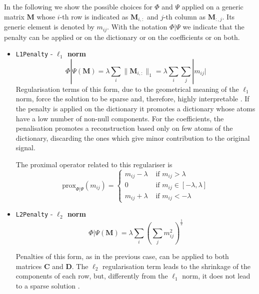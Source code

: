 In the following we show the possible choices for $\Phi$ and $\Psi$ applied on a generic matrix $\textbf{M}$ whose $i$-th row is indicated as $\textbf{M}_{i,:}$ and $j$-th column as $\textbf{M}_{:,j}$. Its generic element is denoted by $m_{ij}$. With the notation $\Phi|\Psi$ we indicate that the penalty can be applied or on the dictionary or on the coefficients or on both.\\
\begin{itemize}
%
%
%
\item \texttt{L1Penalty} - \textbf{$\ell_1$ norm}
\begin{equation}\label{l1penalty}
\Phi|\Psi(\mathbf{M}) = \lambda \sum_i \|\mathbf{M}_{i,:}\|_1 =  \lambda \sum_i \sum_j |m_{ij}|
\end{equation}
Regularisation terms of this form, due to the geometrical meaning of the $\ell_1$ norm, force the solution to be sparse and, therefore, highly interpretable \cite{tibshirani1996regression}. If the penalty is applied on the dictionary it promotes a dictionary whose atoms have a low number of non-null components. For the coefficients, the penalisation promotes a reconstruction based only on few atoms of the dictionary, discarding the ones which give minor contribution to the original signal.

The proximal operator related to this regulariser is
\begin{equation}\label{proxl1}
\text{prox}_{\Phi|\Psi}(m_{ij}) =
\begin{cases}
       m_{ij} - \lambda &\text{ if }m_{ij} > \lambda \\
       0 & \text{ if }m_{ij} \in [-\lambda, \lambda] \\
       m_{ij} + \lambda & \text{ if }m_{ij} < -\lambda
\end{cases}
\end{equation}
%
%
%
\item \texttt{L2Penalty} - \textbf{$\ell_2$ norm}
\begin{equation}\label{l2penalty}
\Phi|\Psi(\mathbf{M}) = \lambda \sum_{i}\left({\sum_j m_{ij}^2}\right)^\frac12
\end{equation}

Penalties of this form, as in the previous case, can be applied to both matrices $\mathbf{C}$ and $\mathbf{D}$.
The $\ell_2$ regularisation term leads to the shrinkage of the components of each row, but, differently from the $\ell_1$ norm, it does not lead to a sparse solution \cite{tikhonov1977solutions}.


\end{itemize}
